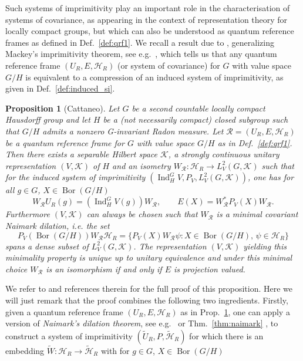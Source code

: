 \documentclass[sn-mathphys-num]{sn-jnl}%
\newcommand{\HH}{\mathcal{H}}
\newcommand{\KK}{\mathcal{K}}
\DeclareMathOperator{\Bor}{Bor}
\DeclareMathOperator{\Ind}{Ind}
\numberwithin{equation}{section}
\theoremstyle{thmstyleone}%
\newtheorem{proposition}[theorem]{Proposition}%
\theoremstyle{thmstyletwo}%
\theoremstyle{thmstylethree}%
\begin{document}
    Such systems of imprimitivity play an important role in the characterisation of systems of covariance, as appearing in the context of representation theory for locally compact groups, but which can also be understood as quantum reference frames as defined in Def.\ \ref{def:qrf1}. We recall a result due to \cite{Cattaneo:1979}, generalizing Mackey's imprimitivity theorem, see e.g.\ \cite{mackey1949imprimitivity,raczka1986theory,kaniuth2012induced}, which tells us that any quantum reference frame $(U_R,E,\HH_R)$ (or system of covariance) for $G$ with value space $G/H$ is equivalent to a compression of an induced system of imprimitivity, as given in Def.\ \ref{def:induced_si}.
\begin{proposition}[Cattaneo]
        \label{prop:cat_impr_thm}
        Let $G$ be a second countable locally compact Hausdorff group and let $H$ be a (not necessarily compact) closed subgroup such that $G/H$ admits a nonzero G-invariant Radon measure. Let $\mathcal{R}=(U_R,E,\HH_R)$ be a quantum reference frame for $G$ with value space $G/H$ as in Def.~\ref{def:qrf1}. 
        Then there exists a separable Hilbert space $\KK$, a strongly continuous unitary representation $(V,\KK)$ of $H$ and an isometry $W_\mathcal{R}:\HH_R\to L^2_V(G,\KK)$ such that for the induced system of imprimitivity $(\Ind_H^G V,P_V,L^2_V(G,\KK))$, one has for all $g\in G$, $X\in\Bor(G/H)$
        \begin{equation}
            W_\mathcal{R}U_R(g)=\left(\Ind_H^G V(g)\right)W_\mathcal{R},\qquad E(X)=W_\mathcal{R}^*P_V(X)W_\mathcal{R}.
        \end{equation}
        Furthermore $(V,\KK)$ can always be chosen such that $W_\mathcal{R}$ is a minimal covariant Naimark dilation, i.e. the set
        \begin{equation}
            P_V(\Bor(G/H))W_\mathcal{R} \HH_R=\{P_V(X)W_\mathcal{R}\psi:X\in \Bor(G/H),\, \psi\in \HH_R\}
        \end{equation}
         spans a dense subset of $L_V^2(G,\KK)$. The representation $(V,\KK)$ yielding this minimality property is unique up to unitary equivalence and under this minimal choice $W_\mathcal{R}$ is an isomorphism if and only if $E$ is projection valued.
\end{proposition}
We refer to \cite{Cattaneo:1979} and references therein for the full proof of this proposition. Here we will just remark that the proof combines the following two ingredients. Firstly, given a quantum reference frame $(U_R,E,\HH_R)$ as in Prop.\ \ref{prop:cat_impr_thm}, one can apply a version of \textit{Naimark's dilation theorem}, see e.g.\ \cite[Thm.\ 4.6.]{Paulsen_2003} or Thm.\ \ref{thm:naimark} , to construct a system of imprimitivity $(\tilde{U}_R,P,\tilde{\HH}_R)$ for which there is an embedding $\tilde{W}:\HH_R\to \tilde{\HH}_R$ with for $g\in G$, $X\in \Bor(G/H)$
\end{document}
